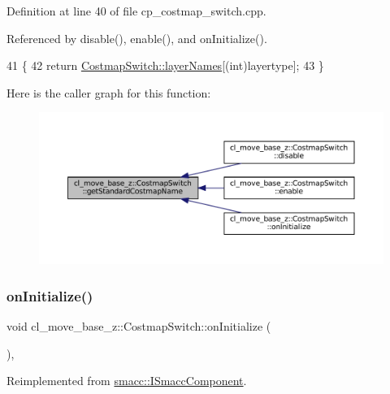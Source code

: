 Definition at line 40 of file cp\+\_\+costmap\+\_\+switch.\+cpp.



Referenced by disable(), enable(), and on\+Initialize().


\begin{DoxyCode}
41 \{
42     \textcolor{keywordflow}{return} \hyperlink{classcl__move__base__z_1_1CostmapSwitch_aee0c75c8f4459cacaf583ef8c90ff329}{CostmapSwitch::layerNames}[(int)layertype];
43 \}
\end{DoxyCode}
Here is the caller graph for this function\+:
\nopagebreak
\begin{figure}[H]
\begin{center}
\leavevmode
\includegraphics[width=350pt]{classcl__move__base__z_1_1CostmapSwitch_ac46796874242fdaa7efef86b66a55102_icgraph}
\end{center}
\end{figure}
\mbox{\label{classcl__move__base__z_1_1CostmapSwitch_ad4d125cd563ed0bb76d27226bc47e63e}} 
\subsubsection{\texorpdfstring{on\+Initialize()}{onInitialize()}}
{\footnotesize\ttfamily void cl\+\_\+move\+\_\+base\+\_\+z\+::\+Costmap\+Switch\+::on\+Initialize (\begin{DoxyParamCaption}{ }\end{DoxyParamCaption})\hspace{0.3cm}{\ttfamily [override]}, {\ttfamily [virtual]}}



Reimplemented from \hyperlink{classsmacc_1_1ISmaccComponent_ae6f71d008db12553912e9436184b9e65}{smacc\+::\+I\+Smacc\+Component}.



